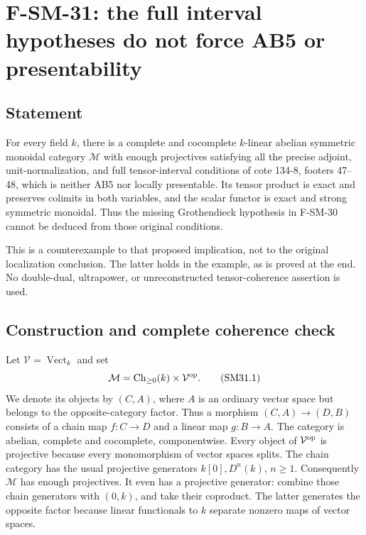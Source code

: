\section{F-SM-31: the full interval hypotheses do not force AB5 or presentability}

\subsection{Statement}
For every field \(k\), there is a complete and cocomplete
\(k\)-linear abelian symmetric monoidal category \(\mathcal M\)
with enough projectives satisfying all the precise adjoint,
unit-normalization, and full tensor-interval conditions of
cote 134-8, footers 47--48, which is neither AB5 nor locally
presentable.  Its tensor product is exact and preserves colimits
in both variables,
and the scalar functor is exact and strong symmetric monoidal.
Thus the missing Grothendieck hypothesis in F-SM-30 cannot be
deduced from those original conditions.

This is a counterexample to that proposed implication, not to
the original localization conclusion.  The latter holds in the
example, as is proved at the end.  No double-dual, ultrapower,
or unreconstructed tensor-coherence assertion is used.

\subsection{Construction and complete coherence check}
Let \(\mathcal V=\operatorname{Vect}_k\) and set
\[
 \mathcal M=\operatorname{Ch}_{\ge0}(k)\times\mathcal V^{\rm op}.
                                                               \tag{SM31.1}
\]
We denote its objects by \((C,A)\), where \(A\) is an ordinary
vector space but belongs to the opposite-category factor.
Thus a morphism \((C,A)\to(D,B)\) consists of a chain map
\(f:C\to D\) and a linear map \(g:B\to A\).
The category is abelian, complete and cocomplete, componentwise.
Every object of \(\mathcal V^{\rm op}\) is projective because
every monomorphism of vector spaces splits.  The chain category
has the usual projective generators \(k[0],D^n(k)\), \(n\ge1\).
Consequently \(\mathcal M\) has enough projectives.
It even has a projective generator: combine those chain
generators with \((0,k)\), and take their coproduct.
The latter generates the opposite factor because linear
functionals to \(k\) separate nonzero maps of vector spaces.

